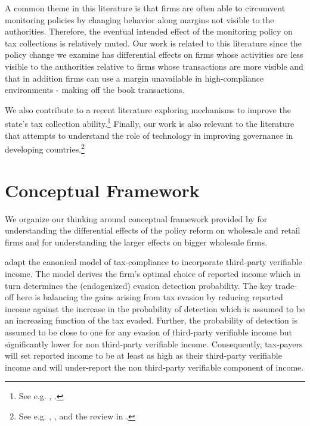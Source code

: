 
A common theme in this literature is that firms are often able to circumvent monitoring policies by changing behavior along margins not visible to the authorities. Therefore, the eventual intended effect of
the monitoring policy on tax collections is relatively muted.  Our work is related to this literature since the policy change we examine has differential effects on firms whose activities are less visible to the authorities relative to firms whose transactions are more visible and that in addition firms can use a margin unavailable in
high-compliance environments - making off the book transactions.

We also contribute to a recent literature exploring mechanisms to improve the state's tax collection ability.\footnote{See e.g. \cite{gordon2009tax}, \cite{khan2016tax}.} Finally, our work is also relevant to the literature that attempts to understand the role of technology in improving governance in developing countries.\footnote{See e.g. \cite{banerjee2016governance}, \cite{muralidharanetal:2016}, and the review in \cite{finan2017personnel}.}

\section{Conceptual Framework}
\label{sec:conceptual}

We organize our thinking around conceptual framework provided by \cite{allinghamsandmo:1972,kleven2011unwilling} for understanding the differential effects of the policy reform on wholesale and retail firms and \cite{kleven2016can} for understanding the larger effects on bigger wholesale firms.

\cite{kleven2011unwilling} adapt the canonical \cite{allinghamsandmo:1972} model of tax-compliance to incorporate
third-party verifiable income. The model derives the firm's optimal choice of reported income which in turn determines the (endogenized) evasion detection probability. The key trade-off here is balancing the gains arising from tax evasion by reducing reported income against the increase in the probability of detection which is assumed to be an increasing function of the tax evaded. Further, the probability of detection is assumed to be close to one for any evasion of third-party verifiable income but significantly lower for non third-party verifiable income. Consequently, tax-payers will set reported income to be at least as high as their third-party verifiable income and will under-report the non third-party verifiable component of income.

